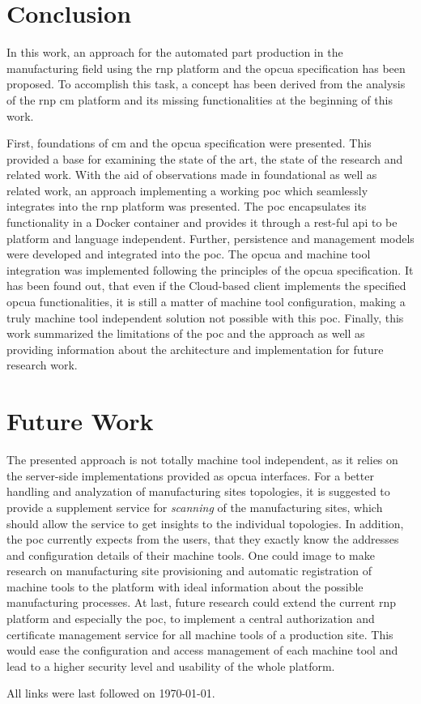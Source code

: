 \documentclass[
a4paper,
twoside,
headsepline,
cleardoublepage=empty,
parskip=half,
draft=false
]{scrbook}
\begin{document}
		\section{Conclusion}\label{sec:conclusion}

			In this work, an approach for the automated part production in the manufacturing field using the \gls{rnp} platform and the \gls{opcua} specification has been proposed. To accomplish this task, a concept has been derived from the analysis of the \gls{rnp} \gls{cm} platform and its missing functionalities at the beginning of this work.

			First, foundations of \gls{cm} and the \gls{opcua} specification were presented. This provided a base for examining the state of the art, the state of the research and related work.
			With the aid of observations made in foundational as well as related work, an approach implementing a working \gls{poc} which seamlessly integrates into the \gls{rnp} platform was presented. 
			The \gls{poc} encapsulates its functionality in a Docker container and provides it through a \gls{rest}-ful \gls{api} to be platform and language independent. 
			Further, persistence and management models were developed and integrated into the \gls{poc}. 
			The \gls{opcua} and machine tool integration was implemented following the principles of the \gls{opcua} specification.
			It has been found out, that even if the Cloud-based client implements the specified \gls{opcua} functionalities, it is still a matter of machine tool configuration, making a truly machine tool independent solution not possible with this \gls{poc}. Finally, this work summarized the limitations of the \gls{poc} and the approach as well as providing information about the architecture and implementation for future research work.

		\section{Future Work}\label{sec:future_work}

			The presented approach is not totally machine tool independent, as it relies on the server-side implementations provided as \gls{opcua} interfaces. 
			For a better handling and analyzation of manufacturing sites topologies, it is suggested to provide a supplement service for \textit{scanning} of the manufacturing sites, which should allow the service to get insights to the individual topologies.
			In addition, the \gls{poc} currently expects from the users, that they exactly know the addresses and configuration details of their machine tools. One could image to make research on manufacturing site provisioning and automatic registration of machine tools to the platform with ideal information about the possible manufacturing processes.
			At last, future research could extend the current \gls{rnp} platform and especially the \gls{poc}, to implement a central authorization and certificate management service for all machine tools of a production site. 
			This would ease the configuration and access management of each machine tool and lead to a higher security level and usability of the whole platform.

	\clearpage


	\printbibliography

	All links were last followed on \today.

	\pagestyle{empty}
	\renewcommand*{\chapterpagestyle}{empty}
	\Versicherung
\end{document}
